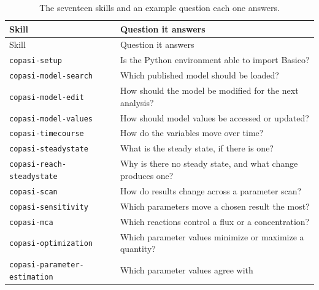 \documentclass[10pt,a4paper,onecolumn]{article}
\begin{document}
  \begin{longtable}[]{@{}
    >{\raggedright\arraybackslash}p{}
    >{\raggedright\arraybackslash}p{}@{}}
  \caption{The seventeen skills and an example question each one answers.
  \label{tab:skills}}\tabularnewline
  \toprule\noalign{}
  \begin{minipage}[b]{\linewidth}\raggedright
  Skill
  \end{minipage} & \begin{minipage}[b]{\linewidth}\raggedright
  Question it answers
  \end{minipage} \\
  \midrule\noalign{}
  \endfirsthead
  \toprule\noalign{}
  \begin{minipage}[b]{\linewidth}\raggedright
  Skill
  \end{minipage} & \begin{minipage}[b]{\linewidth}\raggedright
  Question it answers
  \end{minipage} \\
  \midrule\noalign{}
  \endhead
  \bottomrule\noalign{}
  \endlastfoot
  \texttt{copasi-setup} & Is the Python environment able to import
  Basico? \\
  \texttt{copasi-model-search} & Which published model should be
  loaded? \\
  \texttt{copasi-model-edit} & How should the model be modified for the
  next analysis? \\
  \texttt{copasi-model-values} & How should model values be accessed or
  updated? \\
  \texttt{copasi-timecourse} & How do the variables move over time? \\
  \texttt{copasi-steadystate} & What is the steady state, if there is
  one? \\
  \texttt{copasi-reach-steadystate} & Why is there no steady state, and
  what change produces one? \\
  \texttt{copasi-scan} & How do results change across a parameter scan? \\
  \texttt{copasi-sensitivity} & Which parameters move a chosen result the
  most? \\
  \texttt{copasi-mca} & Which reactions control a flux or a
  concentration? \\
  \texttt{copasi-optimization} & Which parameter values minimize or
  maximize a quantity? \\
  \texttt{copasi-parameter-estimation} & Which parameter values agree with

\end{longtable}
\end{document}

